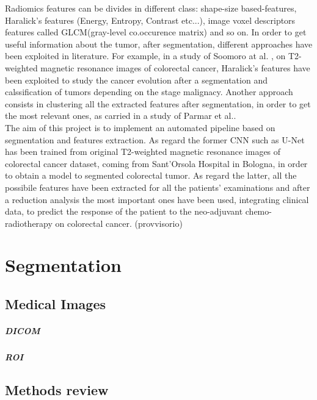 \documentclass[12pt,a4paper]{report}
\begin{document}
Radiomics features can be divides in different class: shape-size based-features, Haralick's features (Energy, Entropy, Contrast etc...), image voxel descriptors features called GLCM(gray-level co.occurence matrix) and so on. In order to get useful information about the tumor, after segmentation, different approaches have been exploited in literature. For example, in a study of Soomoro at al. \cite{Haraliks}, on T2-weighted magnetic resonance images of colorectal cancer, Haralick's features have been exploited to study the cancer evolution after a segmentation and calssification of tumors depending on the stage malignacy. Another approach consists in clustering all the extracted features after segmentation, in order to get the most relevant ones, as carried in a study of Parmar et al.\cite{featurescluster}.\\
The aim of this project is to implement an automated pipeline based on segmentation and features extraction. As regard the former CNN such as U-Net has been trained from original T2-weighted magnetic resonance images of colorectal cancer dataset, coming from Sant'Orsola Hospital in Bologna, in order to obtain a model to segmented colorectal tumor. As regard the latter, all the possibile features have been extracted for all the patients' examinations and after a reduction analysis the most important ones have been used, integrating clinical data, to predict the response of the patient to the neo-adjuvant chemo-radiotherapy on colorectal cancer. (provvisorio)


\chapter{Segmentation}


\section{Medical Images}


\paragraph{DICOM}
\paragraph{ROI}

\section{Methods review}
\end{document}
